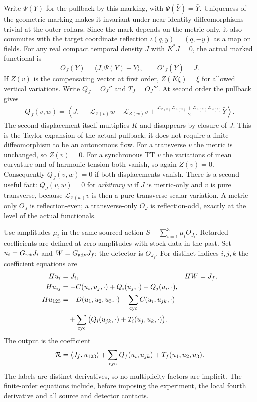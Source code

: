 \documentclass[11pt]{article}
\newcommand{\Lie}{\mathcal L}
\newcommand{\Rret}{G_{\rm ret}}
\newcommand{\Radv}{G_{\rm adv}}
\numberwithin{equation}{section}
\begin{document}
Write $\Psi(Y)$ for the pullback by this marking, with $\Psi(\bar Y)=\bar Y$. Uniqueness of the geometric marking makes it invariant under near-identity diffeomorphisms trivial at the outer collars. Since the mark depends on the metric only, it also commutes with the target coordinate reflection $\iota(q,y)=(q,-y)$ as a map on fields. For any real compact temporal density $J$ with $K^*J=0$, the actual marked functional is
\begin{equation}
 O_J(Y)=\langle J,\Psi(Y)-\bar Y\rangle,\qquad O'_J(\bar Y)=J .
 \label{eq:mark}
\end{equation}
If $Z(v)$ is the compensating vector at first order, $Z(K\xi)=\xi$ for allowed vertical variations. Write $Q_J=O_J''$ and $T_J=O_J'''$. At second order the pullback gives
\begin{align}
 Q_J(v,w)=\left\langle J,\,
       -\Lie_{Z(v)}w-\Lie_{Z(w)}v
       +\frac{\Lie_{Z(v)}\Lie_{Z(w)}+\Lie_{Z(w)}\Lie_{Z(v)}}2\bar Y
                                      \right\rangle .
 \label{eq:Q}
\end{align}
The second displacement itself multiplies $K$ and disappears by closure of $J$. This is the Taylor expansion of the actual pullback; it does not require a finite diffeomorphism to be an autonomous flow. For a transverse $v$ the metric is unchanged, so $Z(v)=0$. For a synchronous TT $v$ the variations of mean curvature and of harmonic tension both vanish, so again $Z(v)=0$. Consequently $Q_J(v,w)=0$ if both displacements vanish. There is a second useful fact: $Q_J(v,w)=0$ for \emph{arbitrary} $w$ if $J$ is metric-only and $v$ is pure transverse, because $\Lie_{Z(w)}v$ is then a pure transverse scalar variation. A metric-only $O_J$ is reflection-even; a transverse-only $O_J$ is reflection-odd, exactly at the level of the actual functionals.

Use amplitudes $\mu_i$ in the same sourced action $S-\sum_{i=1}^3\mu_i O_{J_i}$. Retarded coefficients are defined at zero amplitudes with stock data in the past. Set $u_i=\Rret J_i$ and $W=\Radv J_f$; the detector is $O_{J_f}$. For distinct indices $i,j,k$ the coefficient equations are
\begin{align}
 Hu_i&=J_i, & HW&=J_f,\nonumber\\
 Hu_{ij}&=-C(u_i,u_j,\cdot)+Q_i(u_j,\cdot)+Q_j(u_i,\cdot),\label{eq:second}\\
 Hu_{123}&=-D(u_1,u_2,u_3,\cdot)-\sum_{\rm cyc}C(u_i,u_{jk},\cdot)\nonumber\\
         &\quad+\sum_{\rm cyc}\big(Q_i(u_{jk},\cdot)+T_i(u_j,u_k,\cdot)\big).
 \label{eq:third}
\end{align}
The output is the coefficient
\begin{equation}
 \mathcal R=\langle J_f,u_{123}\rangle+
         \sum_{\rm cyc}Q_f(u_i,u_{jk})+T_f(u_1,u_2,u_3).
 \label{eq:readout}
\end{equation}
The labels are distinct derivatives, so no multiplicity factors are implicit. The finite-order equations include, before imposing the experiment, the local fourth derivative and all source and detector contacts.
\end{document}
